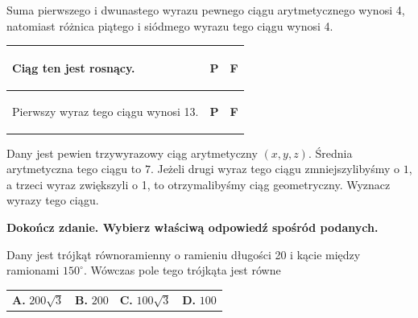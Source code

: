 \documentclass[12pt,a4paper]{article}
\theoremstyle{break}
\begin{document}
	Suma pierwszego i dwunastego wyrazu pewnego ciągu arytmetycznego wynosi 4, natomiast różnica piątego i siódmego wyrazu tego ciągu wynosi 4.
	
	\vspace{0.5cm}
	\begin{tabular}{|p{12.5cm}|p{1cm}|p{1cm}|}
		
		\hline
		\begin{flushleft}
			Ciąg ten jest rosnący.
		\end{flushleft}&\begin{center}
			\textbf{P}
		\end{center}&\begin{center}
			\textbf{F}
		\end{center}\\
		\hline
		\begin{flushleft}
			Pierwszy wyraz tego ciągu wynosi 13.
		\end{flushleft}&\begin{center}
			\textbf{P}
		\end{center}&\begin{center}
			\textbf{F}
		\end{center}\\
		\hline
	\end{tabular}
	
	\begin{zad}[0-4]
		Dany jest pewien trzywyrazowy ciąg arytmetyczny $(x,y,z)$. Średnia arytmetyczna tego ciągu to $7$. Jeżeli drugi wyraz tego ciągu zmniejszylibyśmy o $1$, a trzeci wyraz zwiększyli o 1, to otrzymalibyśmy ciąg geometryczny. Wyznacz wyrazy tego ciągu.
	\end{zad} 

	\newpage
	
	\begin{zad}[0-1]
		\textbf{Dokończ zdanie. Wybierz właściwą odpowiedź spośród podanych.}
	\end{zad} 
	
	Dany jest trójkąt równoramienny o ramieniu długości 20 i kącie między ramionami $150^\circ$. Wówczas pole tego trójkąta jest równe
	
	\vspace{0.5cm}
	\begin{tabular}{p{3.5cm} p{3.5cm} p{3.5cm} p{3.5cm}}
		\textbf{A. }$200\sqrt{3}$&
		\textbf{B. }$200$&
		\textbf{C. }$100\sqrt{3}$&
		\textbf{D. }$100$\\
	\end{tabular}
\end{document}
